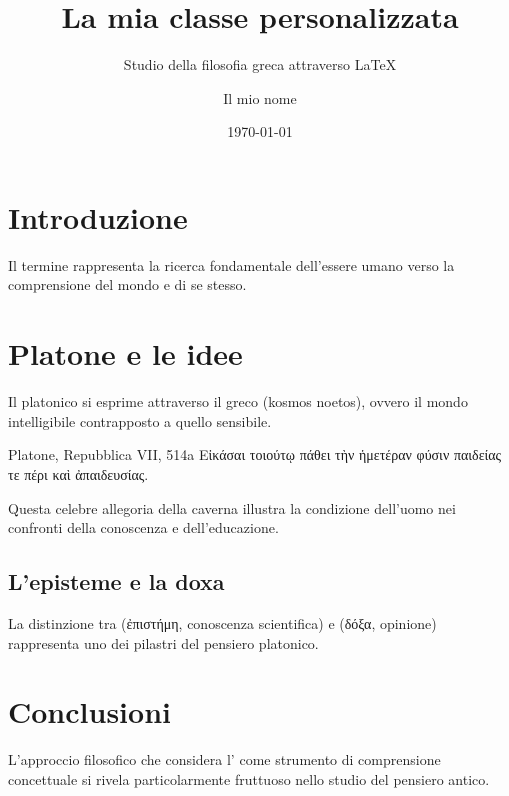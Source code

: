 \documentclass{gs}
\title{La mia classe personalizzata}
\subtitle{Studio della filosofia greca attraverso LaTeX}
\author{Il mio nome}
\date{\today}
\begin{document}
\maketitle

\section{Introduzione}

Il termine  rappresenta la ricerca fondamentale dell'essere umano verso la comprensione del mondo e di se stesso.

\section{Platone e le idee}

Il  platonico si esprime attraverso il greco  (kosmos noetos), ovvero il mondo intelligibile contrapposto a quello sensibile.

\begin{citazionefilosofica}{Platone, Repubblica VII, 514a}
Εἰκάσαι τοιούτῳ πάθει τὴν ἡμετέραν φύσιν παιδείας τε πέρι καὶ ἀπαιδευσίας.
\end{citazionefilosofica}

Questa celebre allegoria della caverna illustra la condizione dell'uomo nei confronti della conoscenza e dell'educazione.

\subsection{L'episteme e la doxa}

La distinzione tra  (ἐπιστήμη, conoscenza scientifica) e  (δόξα, opinione) rappresenta uno dei pilastri del pensiero platonico.

\section{Conclusioni}

L'approccio filosofico che considera l' come strumento di comprensione concettuale si rivela particolarmente fruttuoso nello studio del pensiero antico.
\end{document}
